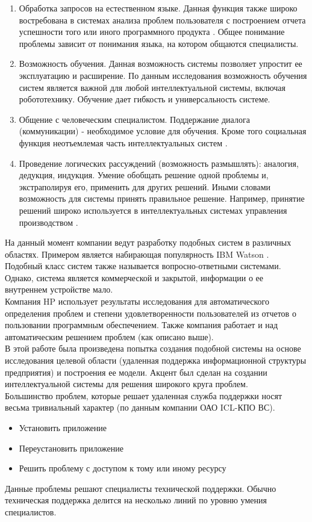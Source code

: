 \begin{enumerate}
  \item Обработка запросов на естественном языке. Данная функция также широко востребована в системах анализа проблем пользователя с построением отчета успешности того или иного программного продукта \cite{TUTUB-1}. Общее понимание проблемы зависит от понимания языка, на котором общаются специалисты.
  \item Возможность обучения. Данная возможность системы позволяет упростит ее эксплуатацию и расширение. По данным исследования \cite{LEARN-1} возможность обучения систем является важной для любой интеллектуальной системы, включая робототехнику. Обучение дает гибкость и универсальность системе.
  \item Общение с человеческим специалистом. Поддержание диалога (коммуникации) - необходимое условие для обучения. Кроме того социальная функция неотъемлемая часть интеллектуальных систем \cite{LEARN-2}.
  \item Проведение логических рассуждений (возможность размышлять): аналогия, дедукция, индукция. Умение обобщать решение одной проблемы и, экстраполируя его, применить для других решений. Иными словами возможность для системы принять правильное решение. Например, принятие решений широко используется в интеллектуальных системах управления производством \cite{LEARN-3}.
\end{enumerate}

На данный момент компании ведут разработку подобных систем в различных областях. Примером является набирающая популярность IBM Watson \cite{WATSON-PO} \cite{WATSON-PTOP}. Подобный класс систем также называется вопросно-ответными системами. Однако, система является коммерческой и закрытой, информации о ее внутреннем устройстве мало. \\
Компания HP использует результаты исследования \cite{TUTUB-2} для автоматического определения проблем и степени удовлетворенности пользователей из отчетов о пользовании программным обеспечением. Также компания работает и над автоматическим решением проблем (как описано выше). \\
В этой работе была произведена попытка создания подобной системы на основе исследования целевой области (удаленная поддержка информационной структуры предприятия) и построения ее модели.
 Акцент был сделан на создании интеллектуальной системы для решения широкого круга проблем. \\
Большинство проблем, которые решает удаленная служба поддержки носят весьма тривиальный характер (по данным компании ОАО ICL-КПО ВС).
\begin{itemize}
	\item Установить приложение
	\item Переустановить приложение
	\item Решить проблему с доступом к тому или иному ресурсу
\end{itemize}
Данные проблемы решают специалисты технической поддержки. Обычно техническая поддержка делится на несколько линий по уровню умения специалистов.

